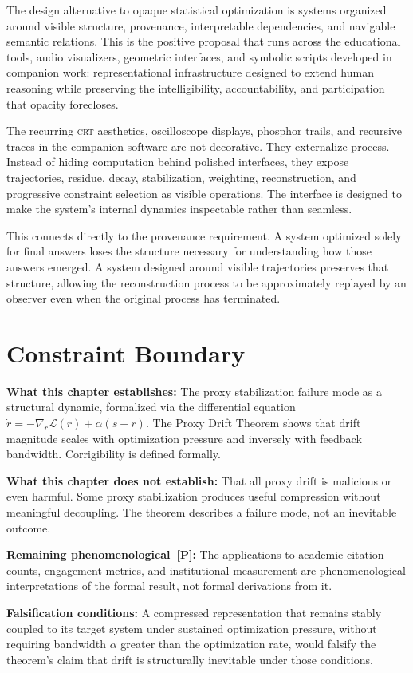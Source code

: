 The design alternative to opaque statistical optimization is systems organized
around visible structure, provenance, interpretable dependencies, and navigable
semantic relations. This is the positive proposal that runs across the educational
tools, audio visualizers, geometric interfaces, and symbolic scripts developed
in companion work: representational infrastructure designed to extend human
reasoning while preserving the intelligibility, accountability, and participation
that opacity forecloses.

The recurring \textsc{crt} aesthetics, oscilloscope displays, phosphor trails,
and recursive traces in the companion software are not decorative. They externalize
process. Instead of hiding computation behind polished interfaces, they expose
trajectories, residue, decay, stabilization, weighting, reconstruction, and
progressive constraint selection as visible operations. The interface is designed
to make the system's internal dynamics inspectable rather than seamless.

This connects directly to the provenance requirement. A system optimized solely
for final answers loses the structure necessary for understanding how those
answers emerged. A system designed around visible trajectories preserves that
structure, allowing the reconstruction process to be approximately replayed by
an observer even when the original process has terminated.

\section*{Constraint Boundary}

\begin{constraintboundary}
\textbf{What this chapter establishes:} The proxy stabilization failure mode as a
structural dynamic, formalized via the differential equation
$\dot{r} = -\nabla_r \mathcal{L}(r) + \alpha(s - r)$. The Proxy Drift Theorem
shows that drift magnitude scales with optimization pressure and inversely with
feedback bandwidth. Corrigibility is defined formally.

\textbf{What this chapter does not establish:} That all proxy drift is malicious or
even harmful. Some proxy stabilization produces useful compression without meaningful
decoupling. The theorem describes a failure mode, not an inevitable outcome.

\textbf{Remaining phenomenological~\textbf{[P]}:} The applications to academic
citation counts, engagement metrics, and institutional measurement are
phenomenological interpretations of the formal result, not formal derivations from it.

\textbf{Falsification conditions:} A compressed representation that remains stably
coupled to its target system under sustained optimization pressure, without requiring
bandwidth $\alpha$ greater than the optimization rate, would falsify the theorem's
claim that drift is structurally inevitable under those conditions.
\end{constraintboundary}
